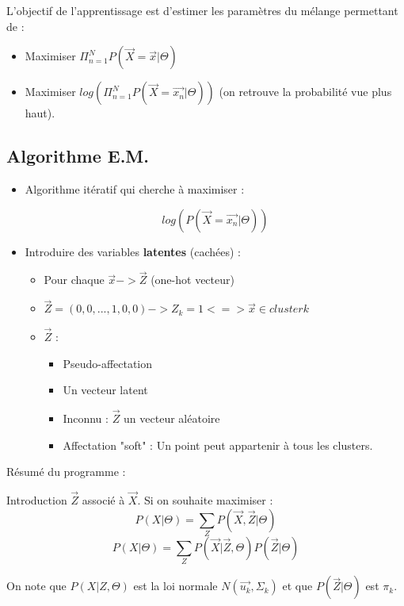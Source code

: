 \documentclass{article}
\begin{document}
L'objectif de l'apprentissage est d'estimer les paramètres du mélange permettant de :

\begin{itemize}
\item Maximiser $ \Pi_{n=1}^N  P(\vec{X} = \vec{x} | \Theta)$

\item Maximiser $log(\Pi_{n=1}^N P(\vec{X} = \vec{x_n} | \Theta))$ (on retrouve la probabilité vue plus haut).

\end{itemize}

\subsection{Algorithme E.M.}

\begin{itemize}

\item Algorithme itératif qui cherche à maximiser : 

\[ log(P(\vec{X} = \vec{x_n} | \Theta))  \]

\item Introduire des variables \textbf{latentes} (cachées) : 

\begin{itemize}

\item Pour chaque $\vec{x} -> \vec{Z}$ (one-hot vecteur)
\item $\vec{Z} = (0, 0, ..., 1, 0, 0) -> Z_k = 1 <=> \vec{x} \in cluster k$
\item $\vec{Z}$ : 
\begin{itemize}
\item Pseudo-affectation
\item Un vecteur latent
\item Inconnu : $\vec{Z}$ un vecteur aléatoire
\item Affectation "soft" : Un point peut appartenir à tous les clusters.
\end{itemize}
\end{itemize}
\end{itemize}

Résumé du programme : 

Introduction $\vec{Z}$ associé à $\vec{X}$. Si on souhaite maximiser : 
\[ P(X | \Theta) = \sum_Z P(\vec{X}, \vec{Z} | \Theta) \]
\[ P(X | \Theta) = \sum_Z P(\vec{X} | \vec{Z}, \Theta) P(\vec{Z} | \Theta) \]

On note que $P(X | Z, \Theta)$ est la loi normale $N(\vec{u_k}, \Sigma_k)$ et que $P(\vec{Z} | \Theta)$ est $\pi_k$.
\end{document}
